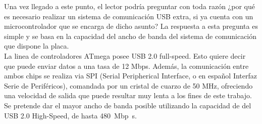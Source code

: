 Una vez llegado a este punto, el lector podría preguntar con toda razón ¿por qué es necesario realizar un sistema de comunicación USB extra, si ya cuenta con un microcontrolador que se encarga de dicho asunto? La respuesta a esta pregunta es simple y se basa en la capacidad del ancho de banda del sistema de comunicación que dispone la placa.\\

La linea de controladores ATmega posee USB 2.0 full-speed. Esto quiere decir que puede enviar datos a una tasa de 12 Mbps. Además, la comunicación entre ambos chips se realiza via SPI (Serial Peripherical Interface, o en español Interfaz Serie de Periféricos), comandada por un cristal de cuarzo de 50 MHz, ofreciendo una velocidad de salida que puede resultar muy lenta a los fines de este trabajo. Se pretende dar el mayor ancho de banda posible utilizando la capacidad de del USB 2.0 High-Speed, de hasta \SI{480}{\mega bp\second}.\\


